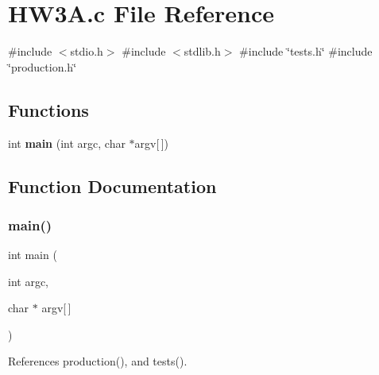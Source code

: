 \section{H\+W3\+A.\+c File Reference}
\label{HW3A_8c}
{\ttfamily \#include $<$stdio.\+h$>$}\newline
{\ttfamily \#include $<$stdlib.\+h$>$}\newline
{\ttfamily \#include \char`\"{}tests.\+h\char`\"{}}\newline
{\ttfamily \#include \char`\"{}production.\+h\char`\"{}}\newline
\subsection*{Functions}
\begin{DoxyCompactItemize}
\item 
int \textbf{ main} (int argc, char $\ast$argv[$\,$])
\end{DoxyCompactItemize}


\subsection{Function Documentation}
\mbox{\label{HW3A_8c_a0ddf1224851353fc92bfbff6f499fa97}} 
\subsubsection{main()}
{\footnotesize\ttfamily int main (\begin{DoxyParamCaption}\item[{int}]{argc,  }\item[{char $\ast$}]{argv[$\,$] }\end{DoxyParamCaption})}



References production(), and tests().

